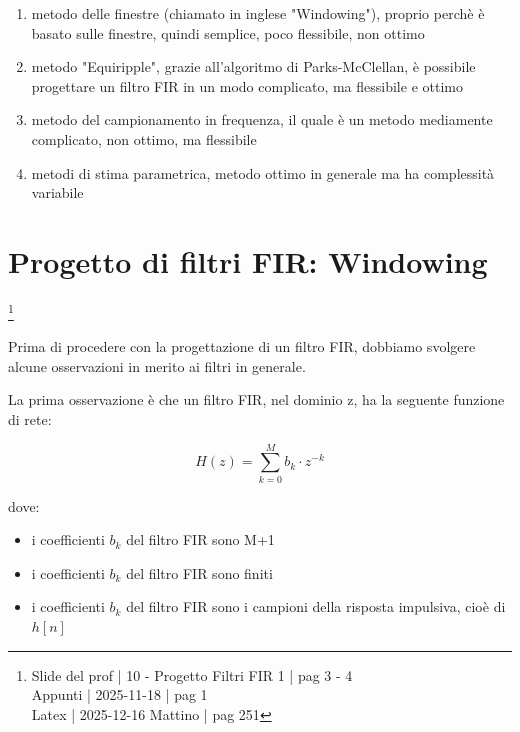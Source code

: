 \begin{enumerate}
    \item metodo delle finestre (chiamato in inglese "Windowing"), proprio perchè è basato sulle finestre, quindi semplice, poco flessibile, non ottimo 
    \item metodo "Equiripple", grazie all'algoritmo di Parks-McClellan, è possibile progettare un filtro FIR in un modo complicato, ma flessibile e ottimo 
    \item metodo del campionamento in frequenza, il quale è un metodo mediamente complicato, non ottimo, ma flessibile 
    \item metodi di stima parametrica, metodo ottimo in generale ma ha complessità variabile 
\end{enumerate} 

\newpage 

\section{Progetto di filtri FIR: Windowing} \label{sec: Progetto di filtri FIR: Windowing}

\footnote{ 
    Slide del prof | 10 - Progetto Filtri FIR 1 | pag 3 - 4\\
    Appunti | 2025-11-18 | pag 1 \\ 
    Latex | 2025-12-16 Mattino | pag 251 
}

Prima di procedere con la progettazione di un filtro FIR, 
dobbiamo svolgere alcune osservazioni in merito ai filtri in generale. \newline 

La prima osservazione è che un filtro FIR, nel dominio z, ha la seguente funzione di rete: 

{
    \Large 
    \begin{equation}
        H \left(z\right) 
        = 
        \sum_{k = 0}^{M} 
        b_k \cdot z^{-k}
    \end{equation}
}

dove: 

\begin{itemize}
    \item i coefficienti $b_k$ del filtro FIR sono M+1 
    \item i coefficienti $b_k$ del filtro FIR sono finiti 
    \item i coefficienti $b_k$ del filtro FIR sono i campioni della risposta impulsiva, cioè di $h \left[ n\right]$ 
\end{itemize} 

